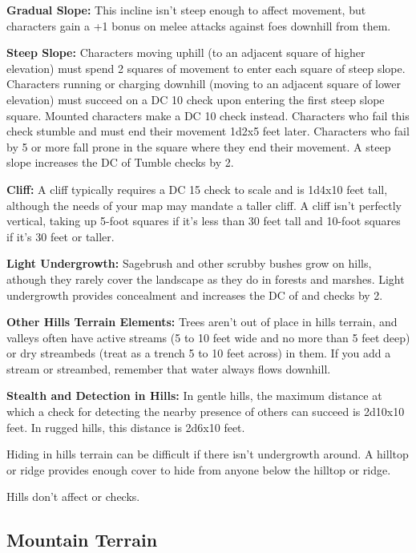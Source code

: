 \textbf{Gradual Slope:} This incline isn't steep enough to affect movement, but 
characters gain a +1 bonus on melee attacks against foes downhill from them.

\textbf{Steep Slope:} Characters moving uphill (to an adjacent square of higher 
elevation) must spend 2 squares of movement to enter each square of steep slope. 
Characters running or charging downhill (moving to an adjacent square of lower 
elevation) must succeed on a DC 10  check upon entering the first steep 
slope square. Mounted characters make a DC 10  check instead. Characters who 
fail this check stumble and must end their movement 1d2x5 feet 
later. Characters who fail by 5 or more fall prone in the square where they end 
their movement. A steep slope increases the DC of Tumble checks by 2.

\textbf{Cliff:} A cliff typically requires a DC 15  check to scale and is 
1d4x10 feet tall, although the needs of your map may mandate 
a taller cliff. A cliff isn't perfectly vertical, taking up 5-foot squares if it's 
less than 30 feet tall and 10-foot squares if it's 30 feet or taller. 

\textbf{Light Undergrowth:} Sagebrush and other scrubby bushes grow on hills, athough 
they rarely cover the landscape as they do in forests and marshes. Light undergrowth 
provides concealment and increases the DC of  and  checks by 
2. 

\textbf{Other Hills Terrain Elements:} Trees aren't out of place in hills terrain, 
and valleys often have active streams (5 to 10 feet wide and no more than 5 feet 
deep) or dry streambeds (treat as a trench 5 to 10 feet across) in them. If you 
add a stream or streambed, remember that water always flows downhill.

\textbf{Stealth and Detection in Hills:} In gentle hills, the maximum distance 
at which a  check for detecting the nearby presence of others can succeed is 
2d10x10 feet. In rugged hills, this distance is 2d6x10 
feet.

Hiding in hills terrain can be difficult if there isn't undergrowth around. A hilltop 
or ridge provides enough cover to hide from anyone below the hilltop or ridge.

Hills don't affect  or  checks. 

\subsection{Mountain Terrain}

